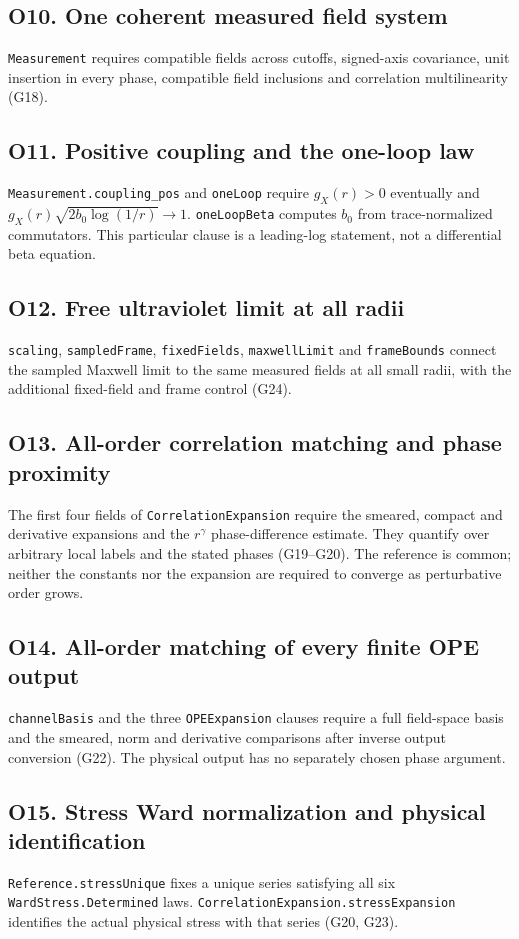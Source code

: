 \documentclass[11pt]{article}
\newcommand{\code}[1]{{\small\nolinkurl{#1}}}
\begin{document}
\subsection*{O10. One coherent measured field system}
\code{Measurement} requires compatible fields across cutoffs,
signed-axis covariance, unit insertion in every phase, compatible
field inclusions and correlation multilinearity (G18).

\subsection*{O11. Positive coupling and the one-loop law}
\code{Measurement.coupling_pos} and \code{oneLoop} require
$g_X(r)>0$ eventually and
$g_X(r)\sqrt{2b_0\log(1/r)}\to1$.
\code{oneLoopBeta} computes $b_0$ from trace-normalized
commutators. This particular clause is a leading-log statement,
not a differential beta equation.

\subsection*{O12. Free ultraviolet limit at all radii}
\code{scaling}, \code{sampledFrame}, \code{fixedFields},
\code{maxwellLimit} and \code{frameBounds} connect the sampled
Maxwell limit to the same measured fields at all small radii,
with the additional fixed-field and frame control (G24).

\subsection*{O13. All-order correlation matching and phase proximity}
The first four fields of \code{CorrelationExpansion} require
the smeared, compact and derivative expansions and the
$r^\gamma$ phase-difference estimate. They quantify over
arbitrary local labels and the stated phases (G19--G20).
The reference is common; neither the constants nor the expansion
are required to converge as perturbative order grows.

\subsection*{O14. All-order matching of every finite OPE output}
\code{channelBasis} and the three \code{OPEExpansion} clauses
require a full field-space basis and the smeared, norm and
derivative comparisons after inverse output conversion (G22).
The physical output has no separately chosen phase argument.

\subsection*{O15. Stress Ward normalization and physical identification}
\code{Reference.stressUnique} fixes a unique series satisfying
all six \code{WardStress.Determined} laws.
\code{CorrelationExpansion.stressExpansion} identifies the
actual physical stress with that series (G20, G23).
\end{document}
